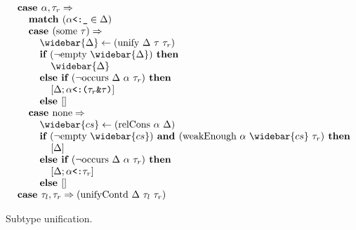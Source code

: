 \documentclass[acmsmall]{acmart}
\begin{document}
\begin{figure*}[h]
\[\begin{array}[t]{@{} l}
    \I \B{case } \alpha, \tau_r \Rightarrow 
    \\
    \I\I \B{match } (\code{$\alpha$<:\_} \in \Delta)
    \\
    \I\I \B{case } (\F{some } \tau) \Rightarrow
    \\
    \I\I\I \widebar{\Delta} \leftarrow (\F{unify } \Delta\ \tau\ \tau_r)
    \\
    \I\I\I \B{if } (\neg \F{empty } \widebar{\Delta}) \B{ then }
    \\
    \I\I\I\I \widebar{\Delta}
    \\
    \I\I\I \B{else if } (\neg \F{occurs } \Delta\ \alpha\ \tau_r) \B{ then }
    \\
    \I\I\I\I [\Delta;\code{$\alpha$<:($\tau_r$\&$\tau$)}]
    \\
    \I\I\I \B{else } [] 
    \\
    \I\I \B{case } \F{none} \Rightarrow
    \\
    \I\I\I \widebar{cs} \leftarrow (\F{relCons } \alpha\ \Delta)  
    \\
    \I\I\I \B{if } (\neg \F{empty } \widebar{cs}) \B{ and } 
    (\F{weakEnough } \alpha\ \widebar{cs}\ \tau_r) \B{ then }
    \\
    \I\I\I\I [\Delta]
    \\
    \I\I\I \B{else if } (\neg \F{occurs } \Delta\ \alpha\ \tau_r) \B{ then }
    \\
    \I\I\I\I [\Delta;\code{$\alpha$<:$\tau_r$}] 
    \\
    \I\I\I \B{else } []

    \\

    \I \B{case } \tau_l, \tau_r \Rightarrow (\text{unifyContd } \Delta\ \tau_l\ \tau_r)


\end{array}
\]

\caption{Subtype unification.}
\end{figure*}
\end{document}
